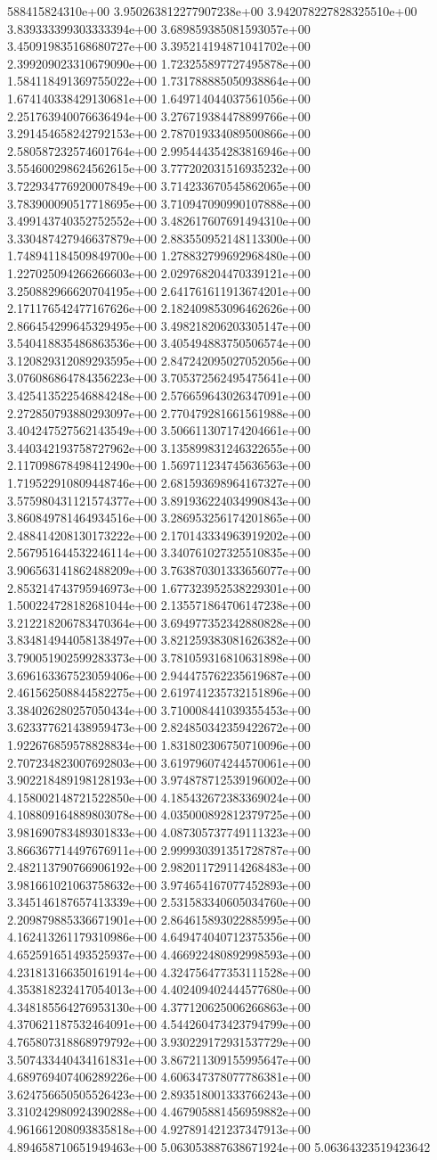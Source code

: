 588415824310e+00	3.950263812277907238e+00	3.942078227828325510e+00	3.839333399303333394e+00	3.689859385081593057e+00	3.450919835168680727e+00	3.395214194871041702e+00	2.399209023310679090e+00	1.723255897727495878e+00	1.584118491369755022e+00	1.731788885050938864e+00	1.674140338429130681e+00	1.649714044037561056e+00	2.251763940076636494e+00	3.276719384478899766e+00	3.291454658242792153e+00	2.787019334089500866e+00	2.580587232574601764e+00	2.995444354283816946e+00	3.554600298624562615e+00	3.777202031516935232e+00	3.722934776920007849e+00	3.714233670545862065e+00	3.783900090517718695e+00	3.710947090990107888e+00	3.499143740352752552e+00	3.482617607691494310e+00	3.330487427946637879e+00	2.883550952148113300e+00	1.748941184509849700e+00	1.278832799692968480e+00	1.227025094266266603e+00	2.029768204470339121e+00	3.250882966620704195e+00	2.641761611913674201e+00	2.171176542477167626e+00	2.182409853096462626e+00	2.866454299645329495e+00	3.498218206203305147e+00	3.540418835486863536e+00	3.405494883750506574e+00	3.120829312089293595e+00	2.847242095027052056e+00	3.076086864784356223e+00	3.705372562495475641e+00	3.425413522546884248e+00	2.576659643026347091e+00	2.272850793880293097e+00	2.770479281661561988e+00	3.404247527562143549e+00	3.506611307174204661e+00	3.440342193758727962e+00	3.135899831246322655e+00	2.117098678498412490e+00	1.569711234745636563e+00	1.719522910809448746e+00	2.681593698964167327e+00	3.575980431121574377e+00	3.891936224034990843e+00	3.860849781464934516e+00	3.286953256174201865e+00	2.488414208130173222e+00	2.170143334963919202e+00	2.567951644532246114e+00	3.340761027325510835e+00	3.906563141862488209e+00	3.763870301333656077e+00	2.853214743795946973e+00	1.677323952538229301e+00	1.500224728182681044e+00	2.135571864706147238e+00	3.212218206783470364e+00	3.694977352342880828e+00	3.834814944058138497e+00	3.821259383081626382e+00	3.790051902599283373e+00	3.781059316810631898e+00	3.696163367523059406e+00	2.944475762235619687e+00	2.461562508844582275e+00	2.619741235732151896e+00	3.384026280257050434e+00	3.710008441039355453e+00	3.623377621438959473e+00	2.824850342359422672e+00	1.922676859578828834e+00	1.831802306750710096e+00	2.707234823007692803e+00	3.619796074244570061e+00	3.902218489198128193e+00	3.974878712539196002e+00	4.158002148721522850e+00	4.185432672383369024e+00	4.108809164889803078e+00	4.035000892812379725e+00	3.981690783489301833e+00	4.087305737749111323e+00	3.866367714497676911e+00	2.999930391351728787e+00	2.482113790766906192e+00	2.982011729114268483e+00	3.981661021063758632e+00	3.974654167077452893e+00	3.345146187657413339e+00	2.531583340605034760e+00	2.209879885336671901e+00	2.864615893022885995e+00	4.162413261179310986e+00	4.649474040712375356e+00	4.652591651493525937e+00	4.466922480892998593e+00	4.231813166350161914e+00	4.324756477353111528e+00	4.353818232417054013e+00	4.402409402444577680e+00	4.348185564276953130e+00	4.377120625006266863e+00	4.370621187532464091e+00	4.544260473423794799e+00	4.765807318868979792e+00	3.930229172931537729e+00	3.507433440434161831e+00	3.867211309155995647e+00	4.689769407406289226e+00	4.606347378077786381e+00	3.624756650505526423e+00	2.893518001333766243e+00	3.310242980924390288e+00	4.467905881456959882e+00	4.961661208093835818e+00	4.927891421237347913e+00	4.894658710651949463e+00	5.063053887638671924e+00	5.06364323519423642